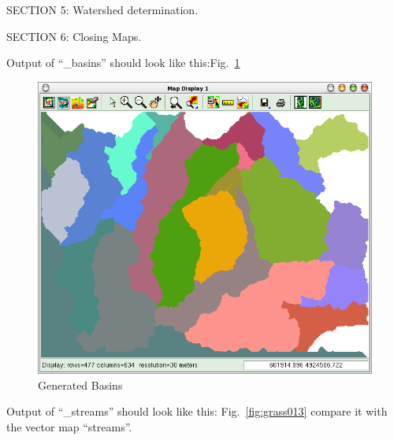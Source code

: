 SECTION 5: Watershed determination.

SECTION 6: Closing Maps.

Output of ``\_basins'' should look like this:Fig.~\ref{fig:grass012}

\begin{figure}[htbp]
   \centering
   \includegraphics[scale=0.35]{grass012.png}
   \caption{Generated Basins}
   \label{fig:grass012}
\end{figure}


Output of ``\_streams'' should look like this: Fig.~\ref{fig:grass013} compare it with
the vector map ``streams''.

